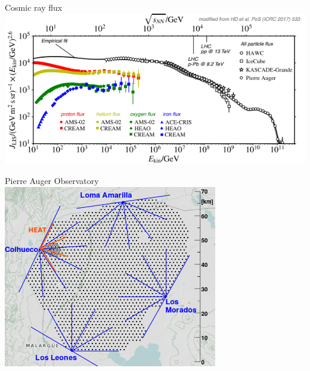 \documentclass[aspectratio=1610, 9pt]{beamer}
\begin{document}
\begin{frame}{Cosmic ray flux}
  \includegraphics[width=\textwidth]{knee_heel.png}
\end{frame}


\begin{frame}{Pierre Auger Observatory}
  \includegraphics[width=0.7\textwidth]{pierre.png}
\end{frame}
\end{document}
